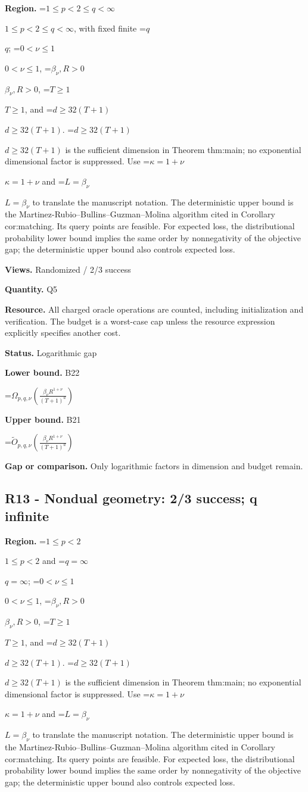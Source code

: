 \documentclass[10pt,a4paper]{article}
\newcommand{\AtlasMath}[1]{\par\begingroup\centering\setbox0=\hbox{$\displaystyle #1$}\ifdim\wd0>1.4\linewidth\typeout{ATLAS WIDE FORMULA: \the\wd0}\fi\ifdim\wd0>\linewidth\resizebox{\linewidth}{!}{\box0}\else\box0\fi\par\endgroup}
\newcommand{\AtlasInlineMath}[1]{\begingroup\setbox0=\hbox{$#1$}\ifdim\wd0>.4\linewidth\endgroup\AtlasMath{#1}\else\endgroup$#1$\fi}
\begin{document}
\textbf{Region.} \AtlasInlineMath{1\le p<2\le q<\infty}, with fixed finite \AtlasInlineMath{q}; \AtlasInlineMath{0<\nu\le1}, \AtlasInlineMath{\beta_\nu,R>0}, \AtlasInlineMath{T\ge1}, and \AtlasInlineMath{d\ge32(T+1)}. \AtlasInlineMath{d\ge32(T+1)} is the sufficient dimension in Theorem thm:main; no exponential dimensional factor is suppressed. Use \AtlasInlineMath{\kappa=1+\nu} and \AtlasInlineMath{L=\beta_\nu} to translate the manuscript notation. The deterministic upper bound is the Martinez-Rubio--Bullins--Guzman--Molina algorithm cited in Corollary cor:matching. Its query points are feasible. For expected loss, the distributional probability lower bound implies the same order by nonnegativity of the objective gap; the deterministic upper bound also controls expected loss.



\textbf{Views.} Randomized / 2/3 success



\textbf{Quantity.} Q5



\textbf{Resource.} All charged oracle operations are counted, including initialization and verification. The budget is a worst-case cap unless the resource expression explicitly specifies another cost.



\textbf{Status.} Logarithmic gap



\textbf{Lower bound.} B22



\AtlasMath{\Omega_{p,q,\nu}\!\left(\frac{\beta_\nu R^{1+\nu}}{(T+1)^a}\right)}


\textbf{Upper bound.} B21



\AtlasMath{\widetilde O_{p,q,\nu}\!\left(\frac{\beta_\nu R^{1+\nu}}{(T+1)^a}\right)}


\textbf{Gap or comparison.} Only logarithmic factors in dimension and budget remain.



\subsection{R13 - Nondual geometry: 2/3 success; q infinite}


\textbf{Region.} \AtlasInlineMath{1\le p<2} and \AtlasInlineMath{q=\infty}; \AtlasInlineMath{0<\nu\le1}, \AtlasInlineMath{\beta_\nu,R>0}, \AtlasInlineMath{T\ge1}, and \AtlasInlineMath{d\ge32(T+1)}. \AtlasInlineMath{d\ge32(T+1)} is the sufficient dimension in Theorem thm:main; no exponential dimensional factor is suppressed. Use \AtlasInlineMath{\kappa=1+\nu} and \AtlasInlineMath{L=\beta_\nu} to translate the manuscript notation. The deterministic upper bound is the Martinez-Rubio--Bullins--Guzman--Molina algorithm cited in Corollary cor:matching. Its query points are feasible. For expected loss, the distributional probability lower bound implies the same order by nonnegativity of the objective gap; the deterministic upper bound also controls expected loss.
\end{document}
